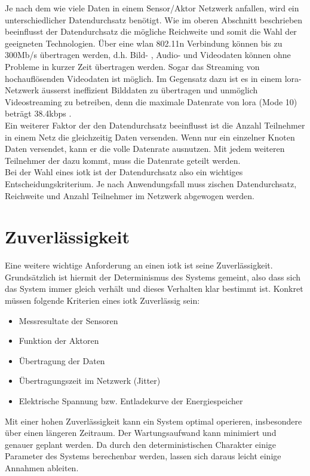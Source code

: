 Je nach dem wie viele Daten in einem Sensor/Aktor Netzwerk anfallen, wird ein unterschiedlicher Datendurchsatz benötigt. Wie im oberen Abschnitt beschrieben beeinflusst der Datendurchsatz die mögliche Reichweite und somit die Wahl der geeigneten Technologien. Über eine \gls{wlan} 802.11n Verbindung können bis zu 300Mb/s übertragen werden, d.h. Bild- , Audio- und Videodaten können ohne Probleme in kurzer Zeit übertragen werden. Sogar das Streaming von hochauflösenden Videodaten ist möglich. Im Gegensatz dazu ist es in einem \gls{lora}-Netzwerk äusserst ineffizient Bilddaten zu übertragen und unmöglich Videostreaming zu betreiben, denn die maximale Datenrate von \gls{lora} (Mode 10) beträgt 38.4kbps \autocite[2]{lora:FAQ}.\\
Ein weiterer Faktor der den Datendurchsatz beeinflusst ist die Anzahl Teilnehmer in einem Netz die gleichzeitig Daten versenden. Wenn nur ein einzelner Knoten Daten versendet, kann er die volle Datenrate ausnutzen. Mit jedem weiteren Teilnehmer der dazu kommt, muss die Datenrate geteilt werden.\\
Bei der Wahl eines \gls{iotk} ist der Datendurchsatz also ein wichtiges Entscheidungskriterium. Je nach Anwendungsfall muss zischen Datendurchsatz, Reichweite und Anzahl Teilnehmer im Netzwerk abgewogen werden.

\section{Zuverlässigkeit}

Eine weitere wichtige Anforderung an einen \gls{iotk} ist seine Zuverlässigkeit. Grundsätzlich ist hiermit der Determinismus des Systems gemeint, also dass sich das System immer gleich verhält und dieses Verhalten klar bestimmt ist. Konkret müssen folgende Kriterien eines \gls{iotk} Zuverlässig sein:
\begin{itemize}  
  \item Messresultate der Sensoren
  \item Funktion der Aktoren
  \item Übertragung der Daten
  \item Übertragungszeit im Netzwerk (Jitter)
  \item Elektrische Spannung bzw. Entladekurve der Energiespeicher
\end{itemize}

Mit einer hohen Zuverlässigkeit kann ein System optimal operieren, insbesondere über einen längeren Zeitraum. Der Wartungsaufwand kann minimiert und genauer geplant werden. Da durch den deterministischen Charakter einige Parameter des Systems berechenbar werden, lassen sich daraus leicht einige Annahmen ableiten.

